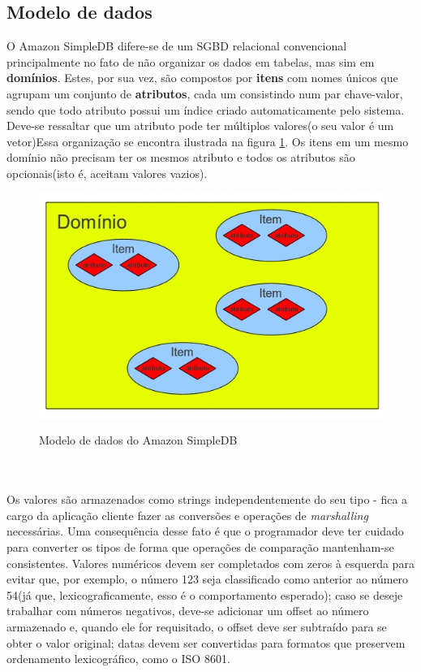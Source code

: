 \subsection{Modelo de dados}
	O Amazon SimpleDB difere-se de um SGBD relacional convencional principalmente no fato de não organizar os dados em tabelas, mas sim em \textbf{domínios}. Estes, por sua vez, são compostos por \textbf{itens} com nomes únicos que agrupam um conjunto de \textbf{atributos}, cada um consistindo num par chave-valor, sendo que todo atributo possui um índice criado automaticamente pelo sistema. Deve-se ressaltar que um atributo pode ter múltiplos valores(o seu valor é um vetor)Essa organização se encontra ilustrada na figura \ref{fig:hierarquiaDados}. Os itens em um mesmo domínio não precisam ter os mesmos atributo e todos os atributos são opcionais(isto é, aceitam valores vazios).
\begin{figure}
	\centering
	\includegraphics[scale=0.5]{figuras/simpledb_hierarquia_dados.jpg}
	\label{fig:hierarquiaDados}
	\caption{Modelo de dados do Amazon SimpleDB}
\end{figure}
\\\\ Os valores são armazenados como strings independentemente do seu tipo - fica a cargo da aplicação cliente fazer as conversões e operações de \textit{marshalling} necessárias. Uma consequência desse fato é que o programador deve ter cuidado para converter os tipos de forma que operações de comparação mantenham-se consistentes. Valores numéricos devem ser completados com zeros à esquerda para evitar que, por exemplo, o número 123 seja classificado como anterior ao número 54(já que, lexicograficamente, esso é o comportamento esperado); caso se deseje trabalhar com números negativos, deve-se adicionar um offset ao número armazenado e, quando ele for requisitado, o offset deve ser subtraído para se obter o valor original; datas devem ser convertidas para formatos que preservem ordenamento lexicográfico, como o ISO 8601.
